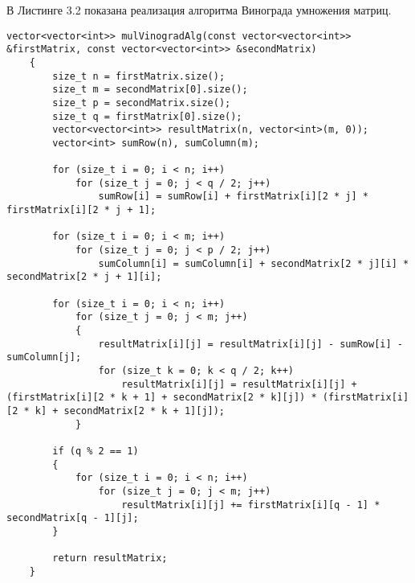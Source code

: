 \newpage

\hspace{0.6cm}В Листинге 3.2 показана реализация алгоритма Винограда умножения матриц.
\begin{lstlisting}[caption=Алгоритм Винограда умножения матриц]
	vector<vector<int>> mulVinogradAlg(const vector<vector<int>> &firstMatrix, const vector<vector<int>> &secondMatrix)
	{
		size_t n = firstMatrix.size();
		size_t m = secondMatrix[0].size();
		size_t p = secondMatrix.size();
		size_t q = firstMatrix[0].size();
		vector<vector<int>> resultMatrix(n, vector<int>(m, 0)); 
		vector<int> sumRow(n), sumColumn(m); 
		
		for (size_t i = 0; i < n; i++)
			for (size_t j = 0; j < q / 2; j++)
				sumRow[i] = sumRow[i] + firstMatrix[i][2 * j] * firstMatrix[i][2 * j + 1]; 
		
		for (size_t i = 0; i < m; i++)
			for (size_t j = 0; j < p / 2; j++)
				sumColumn[i] = sumColumn[i] + secondMatrix[2 * j][i] * secondMatrix[2 * j + 1][i];             
		
		for (size_t i = 0; i < n; i++)
			for (size_t j = 0; j < m; j++)
			{
				resultMatrix[i][j] = resultMatrix[i][j] - sumRow[i] - sumColumn[j];
				for (size_t k = 0; k < q / 2; k++)
					resultMatrix[i][j] = resultMatrix[i][j] + (firstMatrix[i][2 * k + 1] + secondMatrix[2 * k][j]) * (firstMatrix[i][2 * k] + secondMatrix[2 * k + 1][j]);
			}
		
		if (q % 2 == 1)
		{
			for (size_t i = 0; i < n; i++)
				for (size_t j = 0; j < m; j++)
					resultMatrix[i][j] += firstMatrix[i][q - 1] * secondMatrix[q - 1][j];
		}
		
		return resultMatrix;
	}
\end{lstlisting}

\vspace{60mm} 

